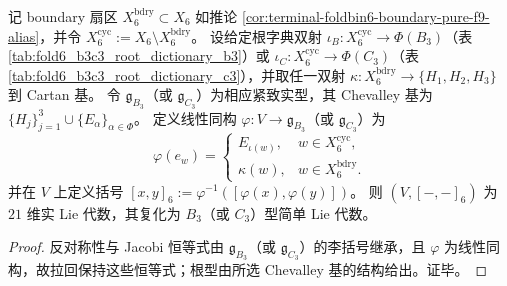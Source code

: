 \begin{theorem}\label{thm:window6-root-dictionary-pullback-bracket}
记 boundary 扇区 \(X_6^{\mathrm{bdry}}\subset X_6\) 如推论 \ref{cor:terminal-foldbin6-boundary-pure-f9-alias}，并令 \(X_6^{\mathrm{cyc}}:=X_6\setminus X_6^{\mathrm{bdry}}\)。
设给定根字典双射 \(\iota_B:X_6^{\mathrm{cyc}}\to \Phi(B_3)\)（表 \ref{tab:fold6_b3c3_root_dictionary_b3}）或 \(\iota_C:X_6^{\mathrm{cyc}}\to \Phi(C_3)\)（表 \ref{tab:fold6_b3c3_root_dictionary_c3}），并取任一双射 \(\kappa:X_6^{\mathrm{bdry}}\to\{H_1,H_2,H_3\}\) 到 Cartan 基。
令 \(\mathfrak{g}_{B_3}\)（或 \(\mathfrak{g}_{C_3}\)）为相应紧致实型，其 Chevalley 基为 \(\{H_j\}_{j=1}^3\cup\{E_\alpha\}_{\alpha\in\Phi}\)。
定义线性同构 \(\varphi:V\to \mathfrak{g}_{B_3}\)（或 \(\mathfrak{g}_{C_3}\)）为
\[
\varphi(e_w)=
\begin{cases}
E_{\iota(w)},& w\in X_6^{\mathrm{cyc}},\\
\kappa(w),& w\in X_6^{\mathrm{bdry}}.
\end{cases}
\]
并在 \(V\) 上定义括号 \([x,y]_6:=\varphi^{-1}([\varphi(x),\varphi(y)])\)。
则 \((V,[-,-]_6)\) 为 \(21\) 维实 Lie 代数，其复化为 \(B_3\)（或 \(C_3\)）型简单 Lie 代数。
\end{theorem}
\begin{proof}
反对称性与 Jacobi 恒等式由 \(\mathfrak{g}_{B_3}\)（或 \(\mathfrak{g}_{C_3}\)）的李括号继承，且 \(\varphi\) 为线性同构，故拉回保持这些恒等式；根型由所选 Chevalley 基的结构给出。证毕。
\end{proof}

